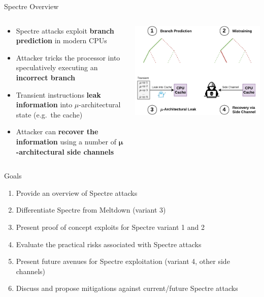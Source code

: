 \documentclass[10pt, dvipsnames, aspectratio=169]{beamer}
\begin{document}
\begingroup
\setwatermark{}
\begin{frame}[c]{Spectre Overview}

\begin{columns}
  \begin{column}{0.5\textwidth}
    \begin{itemize}
      \item Spectre attacks exploit {\bf branch prediction} in modern CPUs
      \vspace{2.2em}
      \item Attacker tricks the processor into speculatively executing an {\bf incorrect branch}
      \vspace{2.2em}
      \item Transient instructions {\bf leak information} into $\mu$-architectural state (e.g.~the cache)
      \vspace{2.2em}
      \item Attacker can {\bf recover the information} using a number of {\bf $\boldsymbol{\mu}$-architectural side channels}
    \end{itemize}
  \end{column}

  \begin{column}{0.5\textwidth}
    \color{black}
    \centering
    \includegraphics[width=0.8\linewidth]{figs/overview.pdf}
  \end{column}
\end{columns}
\end{frame}
\endgroup

\begin{frame}[c]{Goals}
  \begin{enumerate}
    \item Provide an overview of Spectre attacks
    \vfill
    \item Differentiate Spectre from Meltdown (variant 3)
    \vfill
    \item Present proof of concept exploits for Spectre variant 1 and 2
    \vfill
    \item Evaluate the practical risks associated with Spectre attacks
    \vfill
    \item Present future avenues for Spectre exploitation (variant 4, other side channels)
    \vfill
    \item Discuss and propose mitigations against current/future Spectre attacks
  \end{enumerate}
\end{frame}
\end{document}
